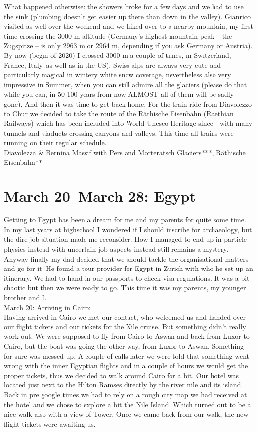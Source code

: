  What happened otherwise: the showers broke for a few days and we had to use the sink (plumbing doesn't get easier up there than down in the valley). Gianrico visited as well over the weekend and we hiked over to a nearby mountain, my first time crossing the 3000 m altitude (Germany's highest mountain peak -- the Zugspitze -- is only 2963 m or 2964 m, depending if you ask Germany or Austria). By now (begin of 2020) I crossed 3000 m a couple of times, in Switzerland, France, Italy, as well as in the US). Swiss alps are always very cute and particularly magical in wintery white snow coverage, nevertheless also very impressive in Summer, when you can still admire all the glaciers (please do that while you can, in 50-100 years from now ALMOST all of them will be sadly gone). And then it was time to get back home. For the train ride from Diavolezzo to Chur we decided to take the route of the R\"athische Eisenbahn (Raethian Railways) which has been included into World Unesco Heritage since - with many tunnels and viaducts crossing canyons and valleys. This time all trains were running on their regular schedule.\\
 
 Diavolezza \& Bernina Massif with Pers and Morteratsch Glaciers***, R\"athische Eisenbahn**

\section{March 20--March 28: Egypt}
\label{2005:Egypt}

Getting to Egypt has been a dream for me and my parents for quite some time. In my last years at highschool I wondered if I should inscribe for archaeology, but the dire job situation made me reconsider. How I managed to end up in particle physics instead with uncertain job aspects instead still remains a mystery. Anyway finally my dad decided that we should tackle the organisational matters and go for it. He found a tour provider for Egypt in Zurich with who he set up an itinerary. We had to hand in our passports to check visa regulations. It was a bit chaotic but then we were ready to go. This time it was my parents, my younger brother and I.\\

March 20: Arriving in Cairo:\\
Having arrived in Cairo we met our contact, who welcomed us and handed over our flight tickets and our tickets for the Nile cruise. But something didn't really work out. We were supposed to fly from Cairo to Aswan and back from Luxor to Cairo, but the boat was going the other way, from Luxor to Aswan. Something for sure was messed up. A couple of calls later we were told that something went wrong with the inner Egyptian flights and in a couple of hours we would get the proper tickets, thus we decided to walk around Cairo for a bit. Our hotel was located just next to the Hilton Ramses directly by the river nile and its island. Back in pre google times we had to rely on a rough city map we had received at the hotel and we chose to explore a bit the Nile Island. Which turned out to be a nice walk also with a view of Tower. Once we came back from our walk, the new flight tickets were awaiting us.\\

